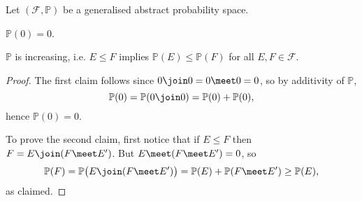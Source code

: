 \documentclass[article, a4paper, 11pt, oneside]{memoir}
\numberwithin{equation}{chapter}
\newcommand{\calF}{\mathcal{F}}
\renewcommand{\P}{\mathbb{P}}
\begin{document}
\begin{lemma}
    Let $(\calF, \P)$ be a generalised abstract probability space.
    \begin{enumlem}
        \item $\P(0) = 0$.
        \item $\P$ is increasing, i.e. $E \leq F$ implies $\P(E) \leq \P(F)$ for all $E,F \in \calF$.
    \end{enumlem}
\end{lemma}

\begin{proof}
    The first claim follows since $0 \join 0 = 0 \meet 0 = 0$, so by additivity of $\P$,
    \begin{equation*}
        \P(0)
            = \P(0 \join 0)
            = \P(0) + \P(0),
    \end{equation*}
    hence $\P(0) = 0$.

    To prove the second claim, first notice that if $E \leq F$ then $F = E \join (F \meet E')$. But $E \meet (F \meet E') = 0$, so
    \begin{equation*}
        \P(F)
            = \P \bigl( E \join (F \meet E') \bigr)
            = \P(E) + \P(F \meet E')
            \geq \P(E),
    \end{equation*}
    as claimed.
\end{proof}


\nocite{*}

\printbibliography
\end{document}
